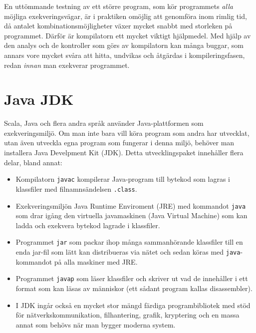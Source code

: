 En uttömmande testning av ett större program, som kör programmets \textit{alla} möjliga exekveringsvägar, är i praktiken omöjlig att genomföra inom rimlig tid, då antalet kombinationsmöjligheter växer mycket snabbt med storleken på programmet.
Därför är kompilatorn ett mycket viktigt hjälpmedel. Med hjälp av den analys och de kontroller som görs av kompilatorn kan många buggar, som annars vore mycket svåra att hitta, undvikas och åtgärdas i kompileringsfasen, redan \textit{innan} man exekverar programmet.


\section{Java JDK}

Scala, Java och flera andra språk använder Java-plattformen som exekveringsmiljö. Om man inte bara vill köra program som andra har utvecklat, utan även utveckla egna program som fungerar i denna miljö, behöver man installera Java Develpment Kit (JDK). Detta utvecklingspaket innehåller flera delar, bland annat:

\begin{itemize}

\item Kompilatorn \texttt{javac} kompilerar Java-program till bytekod som lagras i klassfiler med filnamnsändelsen \texttt{.class}.

\item Exekveringsmiljön Java Runtime Enviroment (JRE) med kommandot \texttt{java} som drar igång den virtuella javamaskinen (Java Virtual Machine) som kan ladda och exekvera bytekod lagrade i klassfiler.

\item Programmet \texttt{jar} som packar ihop många sammanhörande klassfiler till en enda jar-fil som lätt kan distribueras via nätet och sedan köras med \texttt{java}-kommandot på alla maskiner med JRE.

\item Programmet \texttt{javap} som läser klassfiler och skriver ut vad de innehåller i ett format som kan läsas av människor (ett sådant program kallas disassembler).

\item I JDK ingår också en mycket stor mängd färdiga programbibliotek med stöd för nätverkskommunikation, filhantering, grafik, kryptering och en massa annat som behövs när man bygger moderna system.

\end{itemize}

